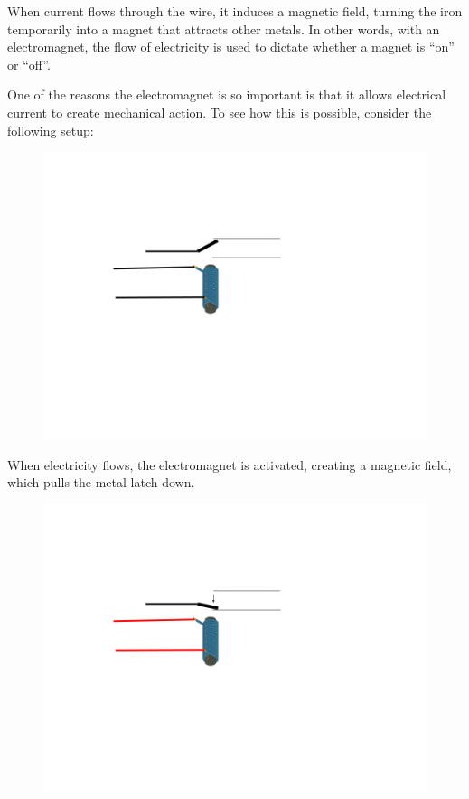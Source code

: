 \documentclass[UTF8]{book}
\begin{document}
\begin{CJK}{UTF8}{gbsn}
When current flows through the wire, it induces a magnetic field, turning the iron temporarily into a magnet that attracts other metals. In other words, with an electromagnet, the flow of electricity is used to dictate whether a magnet is ``on'' or ``off''.

One of the reasons the electromagnet is so important is that it allows electrical current to create mechanical action. To see how this is possible, consider the following setup:

\begin{figure}[H]
\centering
\includegraphics[width=0.8\linewidth]{electromagnet_with_latch}
\end{figure}

When electricity flows, the electromagnet is activated, creating a magnetic field, which pulls the metal latch down.

\begin{figure}[H]
\centering
\includegraphics[width=0.8\linewidth]{electromagnet_with_latch_2}
\end{figure}


\end{CJK}
\end{document}
